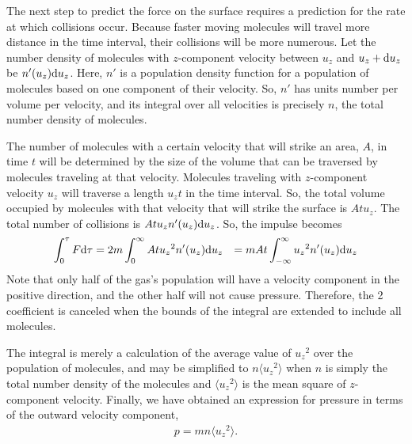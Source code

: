 The next step to predict the force on the surface requires a prediction for the rate at which  collisions occur.  Because faster moving molecules will travel more distance in the time interval, their collisions will be more numerous.  Let the number density of molecules with $z$-component velocity between $u_z$ and $u_z + \mathrm{d} u_z$ be $n'(u_z) \mathrm{d} u_z$.  Here, $n'$ is a population density function for a population of molecules based on one component of their velocity.  So, $n'$ has units number per volume per velocity, and its integral over all velocities is precisely $n$, the total number density of molecules.

The number of molecules with a certain velocity that will strike an area, $A$, in time $t$ will be determined by the size of the volume that can be traversed by molecules traveling at that velocity.  Molecules traveling with $z$-component velocity $u_z$ will traverse a length $u_z t$ in the time interval.  So, the total volume occupied by molecules with that velocity that will strike the surface is $A t u_z$.  The total number of collisions is $A t u_z n'(u_z) \mathrm{d} u_z$.  So, the impulse becomes
\begin{align}
\int_0^\tau F \mathrm{d} \tau &= 2 m \int_0^{\infty} A t u_z{^2} n'(u_z) \mathrm{d} u_z\nonumber
 &= m A t \int_{-\infty}^\infty u_z{^2} n'(u_z) \mathrm{d} u_z
\end{align}
Note that only half of the gas's population will have a velocity component in the positive direction, and the other half will not cause pressure.  Therefore, the 2 coefficient is canceled when the bounds of the integral are extended to include all molecules.

The integral is merely a calculation of the average value of $u_z{^2}$ over the population of molecules, and may be simplified to $n \langle u_z{^2} \rangle$ when $n$ is simply the total number density of the molecules and $\langle u_z{^2} \rangle$ is the mean square of $z$-component velocity.  Finally, we have obtained an expression for pressure in terms of the outward velocity component,
\begin{align}
p = m n \langle u_z{^2}\rangle.
\end{align}

